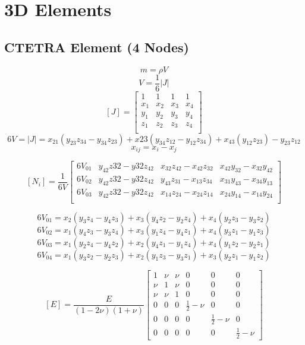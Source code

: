 \section{3D Elements}
   \subsection{CTETRA Element (4 Nodes)}
    \[ m = \rho V \]
    \[ V = \frac{1}{6} |J| \]
    \[ [J] = \left[ \begin{array}{cccc}
               1   & 1   & 1   &   1 \\
               x_1 & x_2 & x_3 & x_4 \\
               y_1 & y_2 & y_3 & y_4 \\
               z_1 & z_2 & z_3 & z_4 \\
            \end{array}\right]\]
    \[ 6V = |J| = x_{21}(y_{23}z_{34} - y_{34}z_{23}) + x23(y_{34}z_{12}-y_{12}z_{34})+x_{43}(y_{12}z_{23})-y_{23}z_{12}\]
    \[ x_{ij} = x_i-x_j \]

    \[ [N_i] = \frac{1}{6V} \left[ \begin{array}{cccc}
                6V_{01} & y_{42}z{32}-y{32}z_{42} & x_{32}z_{42}-x_{42}z_{32} & x_{42}y_{32}-x_{32}y_{42} \\
                6V_{02} & y_{42}z{32}-y{32}z_{42} & y_{43}z_{31}-x_{13}z_{34} & x_{31}y_{43}-x_{34}y_{13} \\
                6V_{03} & y_{42}z{32}-y{32}z_{42} & x_{14}z_{24}-x_{24}z_{14} & x_{24}y_{14}-x_{14}y_{24} \\
            \end{array}\right]\]

    \[ 6V_{01} = x_2(y_3z_4-y_4z_3) + x_3(y_4z_2-y_2z_4)+x_4(y_2z_3-y_3z_2) \]
    \[ 6V_{02} = x_1(y_4z_3-y_3z_4) + x_3(y_1z_4-y_4z_1)+x_4(y_3z_1-y_1z_3) \]
    \[ 6V_{03} = x_1(y_2z_4-y_4z_2) + x_2(y_4z_1-y_1z_4)+x_4(y_1z_2-y_2z_1) \]
    \[ 6V_{04} = x_1(y_3z_2-y_2z_3) + x_2(y_1z_3-y_3z_1)+x_3(y_2z_1-y_1z_2) \]

    \[  [E] = \frac{E}{(1-2\nu)(1+\nu)} \left[ \begin{array}{cccccc}
               1   & \nu & \nu & 0   &   0             & 0 \\
               \nu & 1   & \nu & 0   &   0             & 0 \\
               \nu & \nu &   1 & 0   &   0             & 0 \\
               0   &   0 &   0 & \frac{1}{2}-\nu &   0 & 0 \\
               0   &   0 &   0 & 0   & \frac{1}{2}-\nu & 0 \\
               0   &   0 &   0 & 0   &   0             & \frac{1}{2}-\nu
            \end{array}\right] \]

